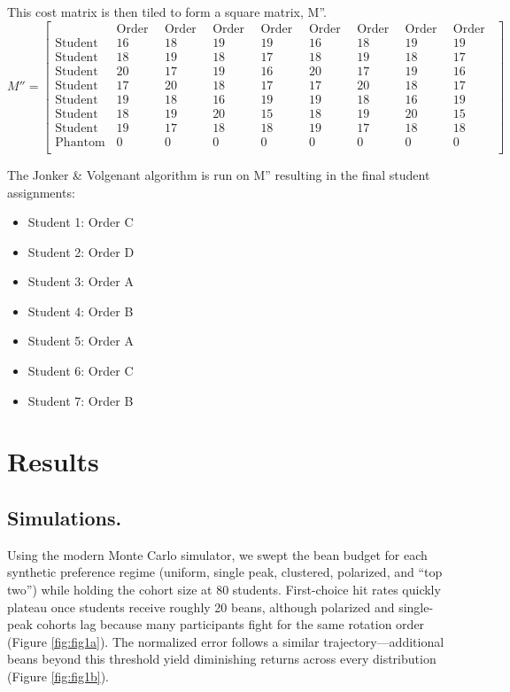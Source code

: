 \documentclass{article}
\begin{document}
This cost matrix is then tiled to form a square matrix, M''.
$$M'' = 
\begin{bmatrix}
    & \text{Order A} & \text{Order B} & \text{Order C} & \text{Order D} & \text{Order A} & \text{Order B} & \text{Order C} & \text{Order D} \\
\text{Student 1} & 16 & 18 & 19 & 19 & 16 & 18 & 19 & 19 \\
\text{Student 2} & 18 & 19 & 18 & 17 & 18 & 19 & 18 & 17 \\
\text{Student 3} & 20 & 17 & 19 & 16 & 20 & 17 & 19 & 16 \\
\text{Student 4} & 17 & 20 & 18 & 17 & 17 & 20 & 18 & 17 \\
\text{Student 5} & 19 & 18 & 16 & 19 & 19 & 18 & 16 & 19 \\
\text{Student 6} & 18 & 19 & 20 & 15 & 18 & 19 & 20 & 15 \\
\text{Student 7} & 19 & 17 & 18 & 18 & 19 & 17 & 18 & 18 \\
\text{Phantom} & 0 & 0 & 0 & 0 & 0 & 0 & 0 & 0 \\
\end{bmatrix}
$$

The Jonker \& Volgenant algorithm is run on M'' resulting in the final student assignments:
\begin{itemize}
\item Student 1: Order C
\item Student 2: Order D
\item Student 3: Order A
\item Student 4: Order B
\item Student 5: Order A
\item Student 6: Order C
\item Student 7: Order B
\end{itemize}

\section{Results}
\subsection{Simulations.}
Using the modern Monte Carlo simulator, we swept the bean budget for each synthetic preference regime (uniform, single peak, clustered, polarized, and ``top two'') while holding the cohort size at 80 students. First-choice hit rates quickly plateau once students receive roughly 20 beans, although polarized and single-peak cohorts lag because many participants fight for the same rotation order (Figure \ref{fig:fig1a}). The normalized error follows a similar trajectory—additional beans beyond this threshold yield diminishing returns across every distribution (Figure \ref{fig:fig1b}).
\end{document}
